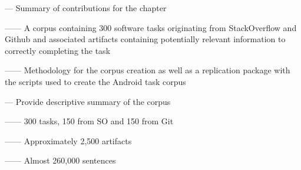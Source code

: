 --- Summary of contributions for the chapter \vspace{3mm}

------ A corpus containing 300 software tasks originating from StackOverflow and Github and associated artifacts containing potentially relevant information to correctly completing the task \vspace{3mm}

------ Methodology for the corpus creation as well as a replication package with the scripts used to create the Android task corpus \vspace{3mm}


--- Provide descriptive summary of the corpus

------ 300 tasks, 150 from SO and 150 from Git

------ Approximately 2,500 artifacts

------ Almost 260,000 sentences







% 



